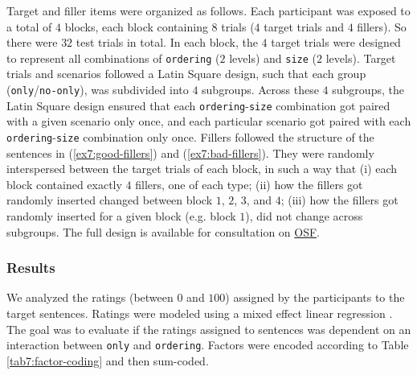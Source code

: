 Target and filler items were organized as follows. Each participant was exposed to a total of $4$ blocks, each block containing $8$ trials ($4$ target trials and $4$ fillers). So there were $32$ test trials in total. In each block, the $4$ target trials were designed to represent all combinations of \texttt{ordering} ($2$ levels) and \texttt{size} ($2$ levels). Target trials and scenarios followed a Latin Square design, such that each group (\texttt{only}/\texttt{no-only}), was subdivided into $4$ subgroups. Across these $4$ subgroups, the Latin Square design ensured that each \texttt{ordering}-\texttt{size} combination got paired with a given scenario only once, and each particular scenario got paired with each \texttt{ordering}-\texttt{size} combination only once. Fillers followed the structure of the sentences in (\ref{ex7:good-fillers}) and (\ref{ex7:bad-fillers}). They were randomly interspersed between the target trials of each block, in such a way that (i) each block contained exactly $4$ fillers, one of each type; (ii) how the fillers got randomly inserted changed between block $1$, $2$, $3$, and $4$; (iii) how the fillers got randomly inserted for a given block (e.g. block $1$), did not change across subgroups. The full design is available for consultation on \href{https://osf.io/fn9p4}{OSF}.




\subsubsection{Results}
We analyzed the ratings (between $0$ and $100$) assigned by the participants to the target sentences. Ratings were modeled using a mixed effect linear regression \citep{Bates2015,Kuznetsova2017}. The goal was to evaluate if the ratings assigned to sentences was dependent on an interaction between \texttt{only} and \texttt{ordering}. Factors were encoded according to Table \ref{tab7:factor-coding} and then sum-coded. 

